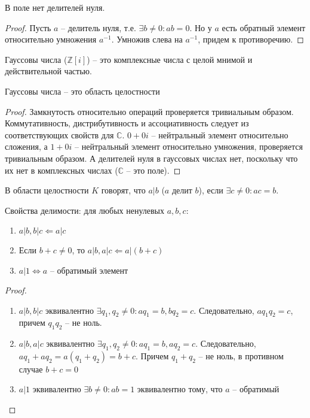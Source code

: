 \documentclass[document.tex]{subfiles}
\begin{document}
\begin{statement}
В поле нет делителей нуля.
\end{statement}
\begin{proof}
Пусть $a$ -- делитель нуля, т.е. $\exists b \neq 0 : ab = 0$. Но у $a$ есть обратный элемент относительно умножения $a^{-1}$. Умножив слева на $a^{-1}$, придем к противоречию.
\end{proof}

\begin{definition}
Гауссовы числа ($\mathbb{Z}[i]$) -- это комплексные числа с целой мнимой и действительной частью.
\end{definition}

\begin{statement}
Гауссовы числа -- это область целостности
\end{statement}
\begin{proof}
Замкнутость относительно операций проверяется тривиальным образом. Коммутативность, дистрибутивность и ассоциативность следует из соответствующих свойств для $\mathbb{C}$. $0 + 0i$ -- нейтральный элемент относительно сложения, а $1 + 0i$ -- нейтральный элемент относительно умножения, проверяется тривиальным образом. А делителей нуля в гауссовых числах нет, поскольку что их нет в комплексных числах ($\mathbb{C}$ -- это поле).
\end{proof}

\begin{definition}
В области целостности $K$ говорят, что $a|b$ ($a$ делит $b$), если $\exists c \neq 0 : ac = b$.
\end{definition}

\begin{statement}
Свойства делимости: для любых ненулевых $a, b, c$:
\begin{enumerate}
\item $a|b, b|c \Leftarrow a|c$
\item Если $b + c \neq 0$, то $a|b, a|c \Leftarrow a|(b+c)$
\item $a|1 \Leftrightarrow a \text{ -- обратимый элемент }$
\end{enumerate}
\end{statement}

\begin{proof}
	~\begin{enumerate}
		\item $a|b, b|c$ эквивалентно $\exists q_1, q_2 \neq 0 : aq_1 = b, bq_2 = c$. Следовательно, $a q_1 q_2 = c$, причем $q_1 q_2$ -- не ноль.
		\item $a|b, a|c$ эквивалентно $\exists q_1, q_2 \neq 0 : aq_1 = b, aq_2 = c$. Следовательно, $a q_1 + a q_2 = a (q_1 + q_2) = b + c$. Причем $q_1 + q_2$ -- не ноль, в противном случае $b+c = 0$
		\item $a|1$ эквивалентно $\exists b \neq 0: ab = 1$ эквивалентно тому, что $a$ -- обратимый
	\end{enumerate}
\end{proof}
\end{document}
